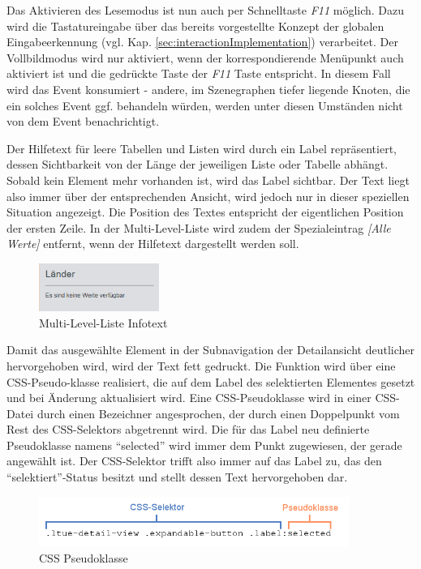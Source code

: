 Das Aktivieren des Lesemodus ist nun auch per Schnelltaste \textit{F11} möglich. Dazu wird die Tastatureingabe über das bereits vorgestellte Konzept der globalen Eingabeerkennung (vgl. Kap. \ref{sec:interactionImplementation}) verarbeitet. Der Vollbildmodus wird nur aktiviert, wenn der korrespondierende Menüpunkt auch aktiviert ist und die gedrückte Taste der \textit{F11} Taste entspricht. In diesem Fall wird das Event konsumiert - andere, im Szenegraphen tiefer liegende Knoten, die ein solches Event ggf. behandeln würden, werden unter diesen Umständen nicht von dem Event benachrichtigt.\par
{}
Der Hilfetext für leere Tabellen und Listen wird durch ein Label repräsentiert, dessen Sichtbarkeit von der Länge der jeweiligen Liste oder Tabelle abhängt. Sobald kein Element mehr vorhanden ist, wird das Label sichtbar. Der Text liegt also immer über der entsprechenden Ansicht, wird jedoch nur in dieser speziellen Situation angezeigt. Die Position des Textes entspricht der eigentlichen Position der ersten Zeile. In der Multi-Level-Liste wird zudem der Spezialeintrag \textit{[Alle Werte]} entfernt, wenn der Hilfetext dargestellt werden soll.\par
\begin{figure}[H]
 \centering
 \includegraphics[width=0.35\textwidth]{grafiken/mll_no_values.png}
 \caption{Multi-Level-Liste Infotext}
 \label{fig:mllNoValues}
\end{figure}
Damit das ausgewählte Element in der Subnavigation der Detailansicht deutlicher hervorgehoben wird, wird der Text fett gedruckt. Die Funktion wird über eine CSS-Pseudo-klasse realisiert, die auf dem Label des selektierten Elementes gesetzt und bei Änderung aktualisiert wird. Eine CSS-Pseudoklasse wird in einer CSS-Datei durch einen Bezeichner angesprochen, der durch einen Doppelpunkt vom Rest des CSS-Selektors abgetrennt wird. Die für das Label neu definierte Pseudoklasse namens \enquote{selected} wird immer dem Punkt zugewiesen, der gerade angewählt ist. Der CSS-Selektor trifft also immer auf das Label zu, das den \enquote{selektiert}-Status besitzt und stellt dessen Text hervorgehoben dar.\par
\begin{figure}[H]
 \centering
 \includegraphics[width=0.9\textwidth]{grafiken/pseudoklasse.png}
 \caption{CSS Pseudoklasse}
 \label{fig:cssPseudoclass}
\end{figure}
